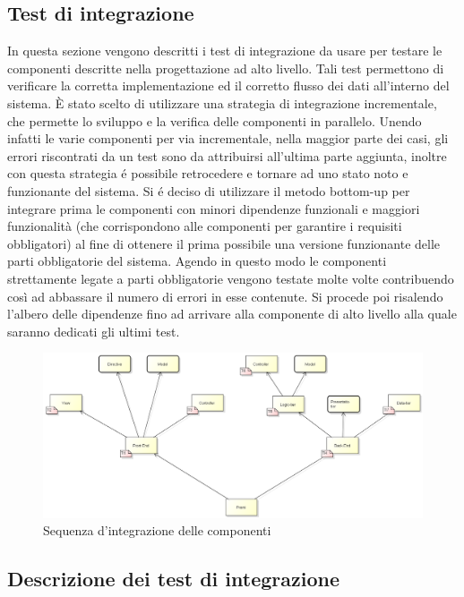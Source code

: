 \newpage

\subsection{Test di integrazione}
In questa sezione vengono descritti i test di integrazione da usare per testare le componenti descritte nella progettazione ad alto livello. Tali test permettono di verificare la corretta implementazione ed il corretto flusso dei dati all'interno del sistema. È stato scelto di utilizzare una strategia di integrazione incrementale, che permette lo sviluppo e la verifica delle componenti in parallelo. Unendo infatti le varie componenti per via incrementale, nella maggior parte dei casi, gli errori riscontrati da un test sono da attribuirsi all'ultima parte aggiunta, inoltre con questa strategia é possibile retrocedere e tornare ad uno stato noto e funzionante del sistema. Si é deciso di utilizzare il metodo bottom-up per integrare prima le componenti con minori dipendenze funzionali e maggiori funzionalità (che corrispondono alle componenti per garantire i requisiti obbligatori) al fine di ottenere il prima possibile una versione funzionante delle parti obbligatorie del sistema. Agendo in questo modo le componenti strettamente legate a parti obbligatorie vengono testate molte volte contribuendo così ad abbassare il numero di errori in esse contenute. Si procede poi risalendo l'albero delle dipendenze fino ad arrivare alla componente di alto livello alla quale saranno dedicati gli ultimi test.

\begin{figure}[h]
\centering
\includegraphics[width=1\linewidth]{img/Integrazione_componenti.png}
\caption[Sequenza d'integrazione delle componenti]{Sequenza d'integrazione delle componenti}
\label{fig:Integrazione_componenti}
\end{figure}

\subsection{Descrizione dei test di integrazione}


